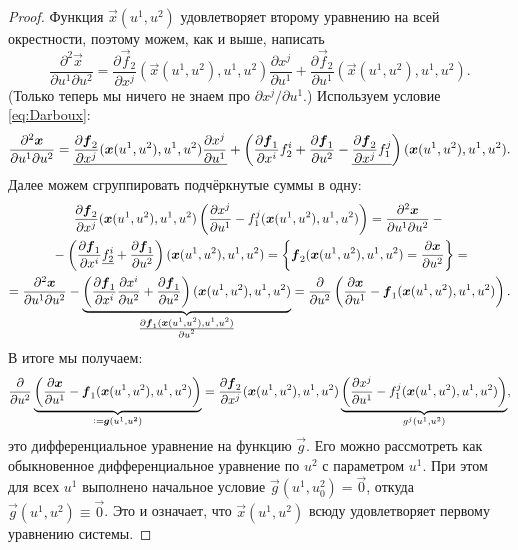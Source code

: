 \begin{proof}
	Функция $\vec{x}(u^1, u^2)$ удовлетворяет второму уравнению на всей окрестности, поэтому можем, как и выше, написать
	\[
		\frac{\partial^2\vec{x}}{\partial u^1\partial u^2} = \frac{\partial\vec{f}_2}{\partial x^j}(\vec{x}(u^1, u^2), u^1, u^2)\frac{\partial x^j}{\partial u^1} + \frac{\partial\vec{f}_2}{\partial u^1}(\vec{x}(u^1, u^2), u^1, u^2).
	\]
	(Только теперь мы ничего не знаем про $\partial x^j / \partial u^1$.) Используем условие \eqref{eq:Darboux}:
	\[
		\frac{\partial^2\boldsymbol{x}}{\partial u^1\partial u^2} = \underline{\frac{\partial\boldsymbol{f}_2}{\partial x^j}(\boldsymbol{x}(u^1, u^2), u^1, u^2)\frac{\partial x^j}{\partial u^1}} + \left(\frac{\partial\boldsymbol{f}_1}{\partial x^i}f_2^i + \frac{\partial\boldsymbol{f}_1}{\partial u^2} - \underline{\frac{\partial\boldsymbol{f}_2}{\partial x^j}f_1^j}\right)(\boldsymbol{x}(u^1, u^2), u^1, u^2).
	\]
	Далее можем сгруппировать подчёркнутые суммы в одну:
	\begin{multline*}
		\frac{\partial\boldsymbol{f}_2}{\partial x^j}(\boldsymbol{x}(u^1, u^2), u^1, u^2)\left(\frac{\partial x^j}{\partial u^1} - f_1^j(\boldsymbol{x}(u^1, u^2), u^1, u^2)\right) = \frac{\partial^2\boldsymbol{x}}{\partial u^1\partial u^2} - {}\\{} - \left(\frac{\partial\boldsymbol{f}_1}{\partial x^i}\underline{f_2^i} + \frac{\partial\boldsymbol{f}_1}{\partial u^2}\right)(\boldsymbol{x}(u^1, u^2), u^1, u^2) = \left\{\boldsymbol{f}_2(\boldsymbol{x}(u^1, u^2), u^1, u^2) = \frac{\partial\boldsymbol{x}}{\partial u^2}\right\} =\\ = \frac{\partial^2\boldsymbol{x}}{\partial u^1\partial u^2} - {\underbrace{\left(\frac{\partial\boldsymbol{f}_1}{\partial x^i}\frac{\partial x^i}{\partial u^2} + \frac{\partial\boldsymbol{f}_1}{\partial u^2}\right)(\boldsymbol{x}(u^1, u^2), u^1, u^2)}_{\frac{\scriptstyle\partial\boldsymbol{f}_1(\boldsymbol{x}(u^1, u^2), u^1, u^2)}{\scriptstyle\partial u^2}}} = \frac{\partial}{\partial u^2}\left(\frac{\partial\boldsymbol{x}}{\partial u^1} - \boldsymbol{f}_1(\boldsymbol{x}(u^1, u^2), u^1, u^2)\right).
	\end{multline*}
	В итоге мы получаем:
	\[
		\frac{\partial}{\partial u^2}\underbrace{\left(\frac{\partial\boldsymbol{x}}{\partial u^1} - \boldsymbol{f}_1(\boldsymbol{x}(u^1, u^2), u^1, u^2)\right)}_{{} \vcentcolon = \boldsymbol{g}(u^1, u^2)} = \frac{\partial\boldsymbol{f}_2}{\partial x^j}(\boldsymbol{x}(u^1, u^2), u^1, u^2)\underbrace{\left(\frac{\partial x^j}{\partial u^1} - f_1^j(\boldsymbol{x}(u^1, u^2), u^1, u^2)\right)}_{g^j(u^1, u^2)},
	\]
	это дифференциальное уравнение на функцию $\vec{g}$. Его можно рассмотреть как обыкновенное дифференциальное уравнение по $u^2$ с параметром $u^1$. При этом для всех $u^1$ выполнено начальное условие $\vec{g}(u^1, u^2_0) = \vec{0}$, откуда $\vec{g}(u^1, u^2) \equiv \vec{0}$. Это и означает, что $\vec{x}(u^1, u^2)$ всюду удовлетворяет первому уравнению системы.
\end{proof}

